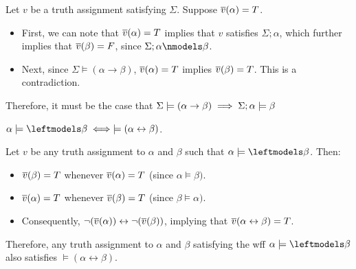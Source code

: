 \begin{problem}
\begin{enumalph}
\begin{Answer}
\begin{enumroman}
          \step
          Let $v$ be a truth assignment satisfying $\Sigma$.
          Suppose $\overline{v}(\alpha) = T$.
          \begin{itemize}
            \item First, we can note that
              $\overline{v}(\alpha) = T$ implies that $v$ satisfies $\Sigma ; \alpha$,
              which further implies that $\overline{v}(\beta) = F$, since $\Sigma ; \alpha \nmodels \beta$.
            \item Next, since $\Sigma \models (\alpha \to \beta)$,
              $\overline{v}(\alpha) = T$ implies $\overline{v}(\beta) = T$. This is a contradiction.
          \end{itemize}
        Therefore, it must be the case that $\Sigma \models (\alpha \rightarrow \beta) \implies \Sigma ; \alpha \models \beta $
      \end{enumroman}
    \end{Answer}
    \item $\alpha \models \backmodels \beta \iff \models (\alpha \leftrightarrow \beta)$.  
    \begin{Answer}
      Let $v$ be any truth assignment to $\alpha$ and $\beta$
      such that $\alpha \models \backmodels \beta$. Then:
      \begin{itemize}
        \item $\overline{v}(\beta) = T$ whenever $\overline{v}(\alpha) = T$ (since $\alpha \models \beta)$.
        \item $\overline{v}(\alpha) = T$ whenever $\overline{v}(\beta) = T$ (since $\beta \models \alpha)$.
        \item Consequently, $\lnot (\overline{v}(\alpha)) \leftrightarrow \lnot (\overline{v}(\beta))$,
        implying that $\overline{v}(\alpha \leftrightarrow \beta) = T$.
      \end{itemize}
      Therefore, any truth assignment to $\alpha$ and $\beta$
      satisfying the wff $\alpha \models \backmodels \beta$ also satisfies
      $\models (\alpha \leftrightarrow \beta)$.
    \end{Answer}
  \end{enumalph}
\end{problem}
